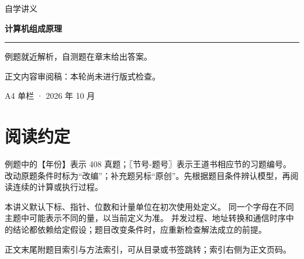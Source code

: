 
\newcommand{\BookTitle}{计算机组成原理}

\begin{titlepage}
\thispagestyle{empty}
\vspace*{25mm}
{\sffamily\color{accent}\fontsize{16}{24} 自学讲义}\par
\vspace{15mm}
{\sffamily\bfseries\color{ink}\fontsize{32}{45}\selectfont 计算机组成原理}\par
\vspace{15mm}
\noindent\rule{\textwidth}{0.5pt}\par
\vspace{5mm}
\noindent 例题就近解析，自测题在章末给出答案。\par
\vspace{5mm}\noindent 正文内容审阅稿：本轮尚未进行版式检查。\par
\vfill
\noindent A4 单栏 · 2026 年 10 月\par
\end{titlepage}
\tableofcontents
\clearpage
{}\chapter*{阅读约定}
例题中的【年份】表示 408 真题；〖节号-题号〗表示王道书相应节的习题编号。
改动原题条件时标为“改编”；补充题另标“原创”。先根据题目条件辨认模型，再阅读连续的计算或执行过程。

本讲义默认下标、指针、位数和计量单位在初次使用处定义。
同一个字母在不同主题中可能表示不同的量，以当前定义为准。
并发过程、地址转换和通信时序中的结论都依赖给定假设；题目改变条件时，应重新检查解法成立的前提。

正文末尾附题目索引与方法索引，可从目录或书签跳转；索引右侧为正文页码。
\clearpage
{}
\setcounter{chapter}{0}



